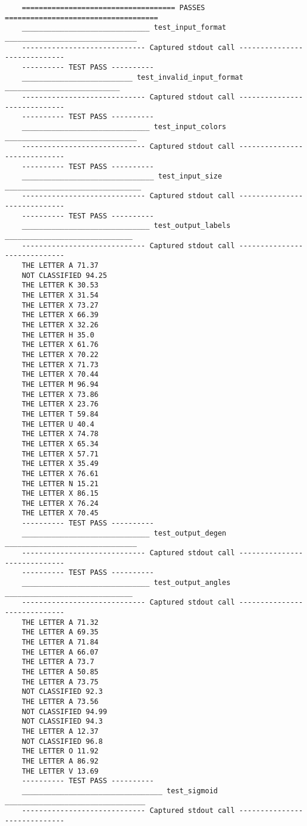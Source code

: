 \documentclass[12pt, titlepage]{article}
\begin{document}
\begin{emumerate}
\begin{small}
\begin{verbatim}
    ==================================== PASSES ====================================
    ______________________________ test_input_format _______________________________
    ----------------------------- Captured stdout call -----------------------------
    ---------- TEST PASS ----------
    __________________________ test_invalid_input_format ___________________________
    ----------------------------- Captured stdout call -----------------------------
    ---------- TEST PASS ----------
    ______________________________ test_input_colors _______________________________
    ----------------------------- Captured stdout call -----------------------------
    ---------- TEST PASS ----------
    _______________________________ test_input_size ________________________________
    ----------------------------- Captured stdout call -----------------------------
    ---------- TEST PASS ----------
    ______________________________ test_output_labels ______________________________
    ----------------------------- Captured stdout call -----------------------------
    THE LETTER A 71.37
    NOT CLASSIFIED 94.25
    THE LETTER K 30.53
    THE LETTER X 31.54
    THE LETTER X 73.27
    THE LETTER X 66.39
    THE LETTER X 32.26
    THE LETTER H 35.0
    THE LETTER X 61.76
    THE LETTER X 70.22
    THE LETTER X 71.73
    THE LETTER X 70.44
    THE LETTER M 96.94
    THE LETTER X 73.86
    THE LETTER X 23.76
    THE LETTER T 59.84
    THE LETTER U 40.4
    THE LETTER X 74.78
    THE LETTER X 65.34
    THE LETTER X 57.71
    THE LETTER X 35.49
    THE LETTER X 76.61
    THE LETTER N 15.21
    THE LETTER X 86.15
    THE LETTER X 76.24
    THE LETTER X 70.45
    ---------- TEST PASS ----------
    ______________________________ test_output_degen _______________________________
    ----------------------------- Captured stdout call -----------------------------
    ---------- TEST PASS ----------
    ______________________________ test_output_angles ______________________________
    ----------------------------- Captured stdout call -----------------------------
    THE LETTER A 71.32
    THE LETTER A 69.35
    THE LETTER A 71.84
    THE LETTER A 66.07
    THE LETTER A 73.7
    THE LETTER A 50.85
    THE LETTER A 73.75
    NOT CLASSIFIED 92.3
    THE LETTER A 73.56
    NOT CLASSIFIED 94.99
    NOT CLASSIFIED 94.3
    THE LETTER A 12.37
    NOT CLASSIFIED 96.8
    THE LETTER O 11.92
    THE LETTER A 86.92
    THE LETTER V 13.69
    ---------- TEST PASS ----------
    _________________________________ test_sigmoid _________________________________
    ----------------------------- Captured stdout call -----------------------------

\end{verbatim}
\end{small}
\end{emumerate}
\end{document}
